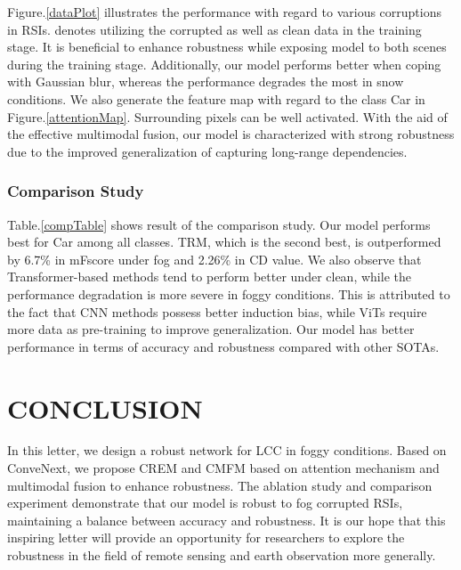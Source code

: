 \documentclass[lettersize,journal]{IEEEtran}
\begin{document}
 Figure.\ref{dataPlot} illustrates the performance with regard to various corruptions in RSIs. \bm{$*$} denotes utilizing the corrupted as well as clean data in the training stage. It is beneficial to enhance robustness while exposing model to both scenes during the training stage. Additionally, our model performs better when coping with Gaussian blur, whereas the performance degrades the most in snow conditions. We also generate the feature map with regard to the class Car in Figure.\ref{attentionMap}. Surrounding pixels can be well activated. With the aid of the effective multimodal fusion, our model is characterized with strong robustness due to the improved generalization of capturing long-range dependencies. 

\subsubsection{Comparison Study}
Table.\ref{compTable} shows result of the comparison study. Our model performs best for Car among all classes. TRM, which is the second best, is outperformed by 6.7\% in mFscore under fog and 2.26\% in CD value. We also observe that Transformer-based methods tend to perform better under clean, while the performance degradation is more severe in foggy conditions. This is attributed to the fact that CNN methods possess better induction bias, while ViTs require more data as pre-training to improve generalization. Our model has better performance in terms of accuracy and robustness compared with other SOTAs.

\section{CONCLUSION}
In this letter, we design a robust network for LCC in foggy conditions. Based on ConveNext, we propose CREM and CMFM based on attention mechanism and multimodal fusion to enhance robustness. The ablation study and comparison experiment demonstrate that our model is robust to fog corrupted RSIs, maintaining a balance between accuracy and robustness. It is our hope that this inspiring letter will provide an opportunity for researchers to explore the robustness in the field of remote sensing and earth observation more generally.



\end{document}
